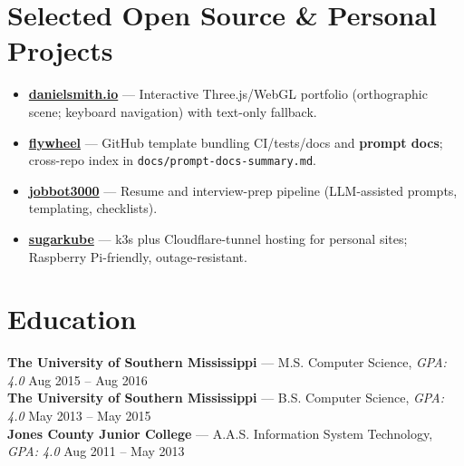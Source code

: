 \documentclass[10pt]{article}
\begin{document}
\vspace{-2mm}
\section*{Selected Open Source \& Personal Projects}
\begin{itemize}
  \item \textbf{\href{https://github.com/futuroptimist/danielsmith.io}{danielsmith.io}} — Interactive Three.js/WebGL portfolio (orthographic scene; keyboard navigation) with text-only fallback.
  \item \textbf{\href{https://github.com/futuroptimist/flywheel}{flywheel}} — GitHub template bundling CI/tests/docs and \textbf{prompt docs}; cross-repo index in \texttt{docs/prompt-docs-summary.md}.
  \item \textbf{\href{https://github.com/futuroptimist/jobbot3000}{jobbot3000}} — Resume and interview-prep pipeline (LLM-assisted prompts, templating, checklists).
  \item \textbf{\href{https://github.com/futuroptimist/sugarkube}{sugarkube}} — k3s plus Cloudflare-tunnel hosting for personal sites; Raspberry Pi-friendly, outage-resistant.
\end{itemize}

\vspace{-2mm}
\section*{Education}
\textbf{The University of Southern Mississippi} — M.S. Computer Science, \textit{GPA: 4.0} \hfill Aug 2015 -- Aug 2016 \\
\textbf{The University of Southern Mississippi} — B.S. Computer Science, \textit{GPA: 4.0} \hfill May 2013 -- May 2015 \\
\textbf{Jones County Junior College} — A.A.S. Information System Technology, \textit{GPA: 4.0} \hfill Aug 2011 -- May 2013
\end{document}
